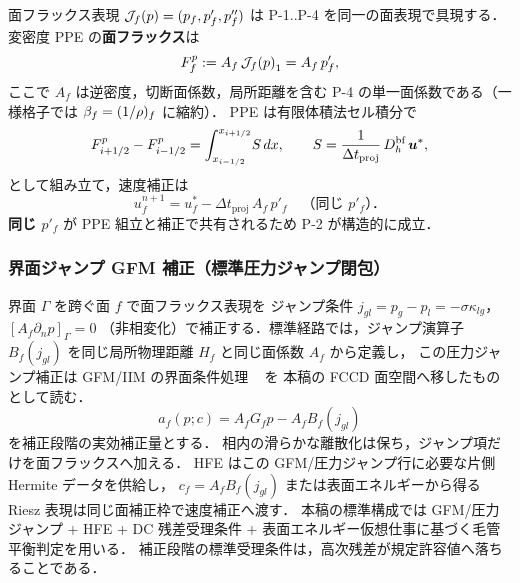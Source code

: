 面フラックス表現 $\mathcal{J}_{f}\!\left(p\right)=(p_f,p'_f,p''_f)$ は
P-1..P-4 を同一の面表現で具現する．
変密度 PPE の\textbf{面フラックス}は
\begin{equation}
  F^p_f := A_f\,\mathcal{J}_{f}\!\left(p\right)_1 = A_f\,p'_f,
  \label{eq:fccd_bf_face_flux}
\end{equation}
ここで $A_f$ は逆密度，切断面係数，局所距離を含む
P-4 の単一面係数である（一様格子では $\beta_{f}=(1/\rho)_f$ に縮約）．
PPE は有限体積法セル積分で
\begin{equation}
  F^p_{i+1/2} - F^p_{i-1/2}
    = \int_{x_{i-1/2}}^{x_{i+1/2}}\! S\,dx,
  \qquad S = \frac{1}{\Delta t_{\mathrm{proj}}}\,D_h^\text{bf}\,\bm{u}^*,
  \label{eq:fccd_bf_cell_balance}
\end{equation}
として組み立て，速度補正は
\begin{equation}
  u_f^{n+1}
    = u_f^* - \Delta t_{\mathrm{proj}}\,A_f\,p'_f
    \quad\text{（同じ }p'_f\text{）．}
  \label{eq:fccd_bf_corrector}
\end{equation}
\textbf{同じ $p'_f$} が PPE 組立と補正で共有されるため P-2 が構造的に成立．

\subsubsection{界面ジャンプ GFM 補正（標準圧力ジャンプ閉包）}
\label{sec:fccd_bf_gfm_integration}

界面 $\Gamma$ を跨ぐ面 $f$ で面フラックス表現を
ジャンプ条件 $j_{gl}=p_g-p_l=-\sigma\kappa_{lg}$，$[A_f\partial_n p]_\Gamma=0$
（非相変化）で補正する．標準経路では，ジャンプ演算子
$B_f(j_{gl})$ を同じ局所物理距離 $H_f$ と同じ面係数 $A_f$ から定義し，
この圧力ジャンプ補正は GFM/IIM の界面条件処理
~\cite{Fedkiw1999,Kang2000,LeVequeLi1994,Li2003IIMOverview} を
本稿の FCCD 面空間へ移したものとして読む．
\begin{equation}
  a_f(p;c)
    = A_f G_f p - A_f B_f(j_{gl})
  \label{eq:fccd_bf_gfm_face}
\end{equation}
を補正段階の実効補正量とする．
相内の滑らかな離散化は保ち，ジャンプ項だけを面フラックスへ加える．
HFE はこの GFM/圧力ジャンプ行に必要な片側 Hermite データを供給し，
$c_f=A_f B_f(j_{gl})$ または表面エネルギーから得る
Riesz 表現は同じ面補正枠で速度補正へ渡す．
本稿の標準構成では GFM/圧力ジャンプ + HFE + DC 残差受理条件 +
表面エネルギー仮想仕事に基づく毛管平衡判定を用いる．
補正段階の標準受理条件は，高次残差が規定許容値へ落ちることである．

